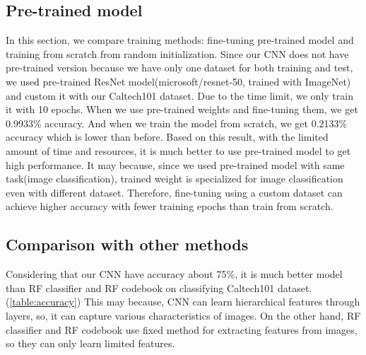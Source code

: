 \subsection{Pre-trained model}
In this section, we compare training methods: fine-tuning pre-trained model and training from scratch from random initialization. Since our CNN does not have pre-trained version because we have only one dataset for both training and test, we used pre-trained ResNet model(microsoft/resnet-50, trained with ImageNet) and custom it with our Caltech101 dataset. Due to the time limit, we only train it with 10 epochs. When we use pre-trained weights and fine-tuning them, we get 0.9933\% accuracy. And when we train the model from scratch, we get 0.2133\% accuracy which is lower than before. Based on this result, with the limited amount of time and resources, it is much better to use pre-trained model to get high performance. It may because, since we used pre-trained model with same task(image classification), trained weight is specialized for image classification even with different dataset. Therefore, fine-tuning using a custom dataset can achieve higher accuracy with fewer training epochs than train from scratch.

\subsection{Comparison with other methods}
Considering that our CNN have accuracy about 75\%, it is much better model than RF classifier and RF codebook on classifying Caltech101 dataset. (\cref{table:accuracy}) This may because, CNN can learn hierarchical features through layers, so, it can capture various characteristics of images. On the other hand, RF classifier and RF codebook use fixed method for extracting features from images, so they can only learn limited features.

\begin{table}[htbp]
	\centering
	\setlength{\tabcolsep}{6pt} %
	\renewcommand{\arraystretch}{1.5} %
	\caption{Accuracy of Models}
	\label{table:accuracy}
\end{table}